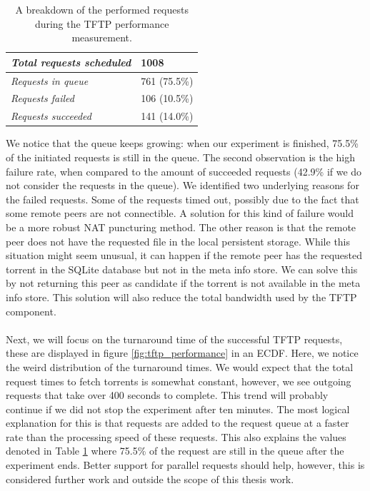 \begin{table}[h!]
	\centering
	\begin{tabular}{|l|l|}
		\hline
		\emph{Total requests scheduled} & 1008 \\ \hline
		\emph{Requests in queue} & 761 (75.5\%)\\ \hline
		\emph{Requests failed} & 106 (10.5\%)\\ \hline
		\emph{Requests succeeded} & 141 (14.0\%)\\ \hline
	\end{tabular}
	\caption{A breakdown of the performed requests during the TFTP performance measurement.}
	\label{table:tftp-performance}
\end{table}

We notice that the queue keeps growing: when our experiment is finished, 75.5\% of the initiated requests is still in the queue. The second observation is the high failure rate, when compared to the amount of succeeded requests (42.9\% if we do not consider the requests in the queue). We identified two underlying reasons for the failed requests. Some of the requests timed out, possibly due to the fact that some remote peers are not connectible. A solution for this kind of failure would be a more robust NAT puncturing method. The other reason is that the remote peer does not have the requested file in the local persistent storage. While this situation might seem unusual, it can happen if the remote peer has the requested torrent in the SQLite database but not in the meta info store. We can solve this by not returning this peer as candidate if the torrent is not available in the meta info store. This solution will also reduce the total bandwidth used by the TFTP component.\\\\
Next, we will focus on the turnaround time of the successful TFTP requests, these are displayed in figure \ref{fig:tftp_performance} in an ECDF. Here, we notice the weird distribution of the turnaround times. We would expect that the total request times to fetch torrents is somewhat constant, however, we see outgoing requests that take over 400 seconds to complete. This trend will probably continue if we did not stop the experiment after ten minutes. The most logical explanation for this is that requests are added to the request queue at a faster rate than the processing speed of these requests. This also explains the values denoted in Table \ref{table:tftp-performance} where 75.5\% of the request are still in the queue after the experiment ends. Better support for parallel requests should help, however, this is considered further work and outside the scope of this thesis work.

